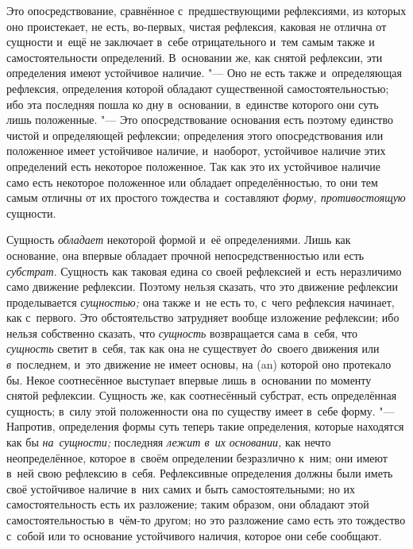 Это опосредствование, сравнённое с~предшествующими рефлексиями, из которых оно
проистекает, не есть, во-первых, чистая рефлексия, каковая не отлична от
сущности и~ещё не заключает в~себе отрицательного и~тем самым также и
самостоятельности определений. В~основании же, как снятой рефлексии, эти
определения имеют устойчивое наличие. "--- Оно не есть также и~определяющая
рефлексия, определения которой обладают существенной самостоятельностью; ибо
эта последняя пошла ко дну в~основании, в~единстве которого они суть лишь
положенные. "--- Это опосредствование основания есть поэтому единство чистой и
определяющей рефлексии; определения этого опосредствования или положенное имеет
устойчивое наличие, и~наоборот, устойчивое наличие этих определений есть
некоторое положенное. Так как это их устойчивое наличие само есть некоторое
положенное или обладает определённостью, то они тем самым отличны от их
простого тождества и~составляют {\em форму, противостоящую} сущности.

Сущность {\em обладает} некоторой формой и~её определениями. Лишь как
основание, она впервые обладает прочной непосредственностью или есть
{\em субстрат}. Сущность как таковая едина со своей рефлексией и~есть
неразличимо само движение рефлексии. Поэтому нельзя сказать, что это движение
рефлексии проделывается {\em сущностью;} она также и~не есть то, с~чего
рефлексия начинает, как с~первого. Это обстоятельство затрудняет вообще
изложение рефлексии; ибо нельзя собственно сказать, что {\em сущность}
возвращается сама в~себя, что {\em сущность} светит в~себя, так как она не
существует {\em до}~своего движения или {\em в}~последнем, и~это движение не
имеет основы, на (an) которой оно протекало бы. Некое соотнесённое выступает
впервые лишь в~основании по моменту снятой рефлексии. Сущность же, как
соотнесённый субстрат, есть определённая сущность; в~силу этой положенности она
по существу имеет в~себе форму. "--- Напротив, определения формы суть теперь
такие определения, которые находятся как бы {\em на~сущности;} последняя
{\em лежит в~их основании,} как нечто неопределённое, которое в~своём
определении безразлично к~ним; они имеют в~ней свою рефлексию в~себя.
Рефлексивные определения должны были иметь своё устойчивое наличие в~них самих
и быть самостоятельными; но их самостоятельность есть их разложение; таким
образом, они обладают этой самостоятельностью в~чём-то другом; но это
разложение само есть это тождество с~собой или то основание устойчивого
наличия, которое они себе сообщают.

